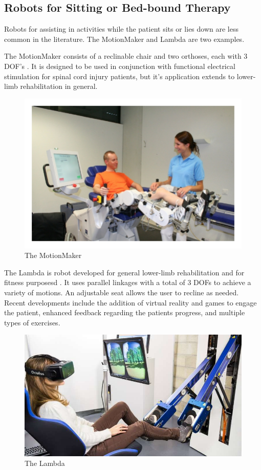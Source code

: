 \documentclass[12pt]{report}
\begin{document}
	\subsection{Robots for Sitting or Bed-bound Therapy}
	
	Robots for assisting in activities while the patient sits or lies down are less common in the literature. The MotionMaker and Lambda are two examples. 
	
	The MotionMaker consists of a reclinable chair and two orthoses, each with 3 DOF's \cite{Schmitt2004}. It is designed to be used in conjunction with functional electrical stimulation for spinal cord injury patients, but it's application extends to lower-limb rehabilitation in general. 
	
	\begin{figure}[t] 
		\centering
		\includegraphics[width=0.75\linewidth]{Motionmaker}
		\caption{The MotionMaker}
		\label{fig:Motionmaker}
	\end{figure}
	
	The Lambda is robot developed for general lower-limb rehabilitation and for fitness purposesd \cite{Bouri2009}. It uses parallel linkages with a total of 3 DOFs to achieve a variety of motions. An adjustable seat allows the user to recline as needed. Recent developments include the addition of virtual reality and games to engage the patient, enhanced feedback regarding the patients progress, and multiple types of exercises. 
	
	\begin{figure}[t] 
		\centering
		\includegraphics[width=0.75\linewidth]{Lambda}
		\caption{The Lambda}
		\label{fig:Lambda}
	\end{figure}
	
\end{document}
